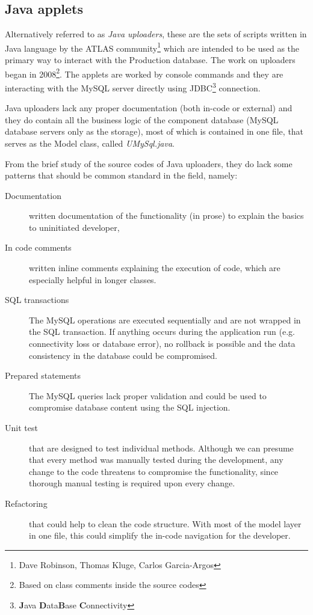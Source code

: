 \subsection{Java applets}
\label{sec:javaUploaders}
\par Alternatively referred to as  \emph{Java uploaders}, these are the sets of scripts written in Java language by the ATLAS community\footnote{Dave Robinson, Thomas Kluge, Carlos Garcia-Argos} which are intended to be used as the primary way to interact with the Production database. The work on uploaders began in 2008\footnote{Based on class comments inside the source codes}. The applets are worked by console commands and they are interacting with the MySQL server directly using JDBC\footnote{\textbf{J}ava \textbf{D}ata\textbf{B}ase \textbf{C}onnectivity} connection.

\par Java uploaders lack any proper documentation (both in-code or external) and they do contain all the business logic of the component database (MySQL database servers only as the storage), most of which is contained in one file, that serves as the Model class, called \emph{UMySql.java}.

\par From the brief study of the source codes of Java uploaders, they do lack some patterns that should be common standard in the field, namely:

\begin{description}
	\item [Documentation] written documentation of the functionality (in prose) to explain the basics to uninitiated developer,
	\item [In code comments] written inline comments explaining the execution of code, which are especially helpful in longer classes.
	\item [SQL transactions] The MySQL operations are executed sequentially and are not wrapped in the SQL transaction. If anything occurs during the application run (e.g. connectivity loss or database error), no rollback is possible and the data consistency in the database could be compromised.
	\item [Prepared statements] The MySQL queries lack proper validation and could be used to compromise database content using the SQL injection. 
	\item [Unit test] that are designed to test individual methods. Although we can presume that every method was manually tested during the development, any change to the code threatens to compromise the functionality, since thorough manual testing is required upon every change.
	\item [Refactoring] that could help to clean the code structure. With most of the model layer in one file, this could simplify the in-code navigation for the developer.
\end{description}

